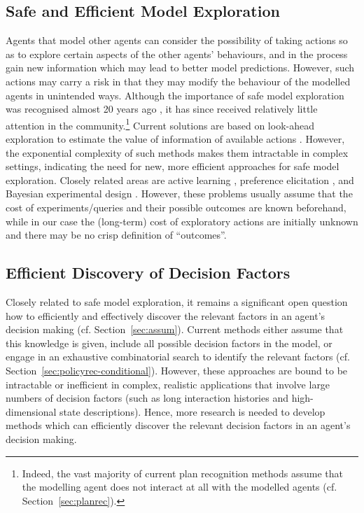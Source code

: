 \documentclass[final,1p,times,authoryear]{elsarticle}
\begin{document}
		\subsection{Safe and Efficient Model Exploration}

Agents that model other agents can consider the possibility of taking actions so as to explore certain aspects of the other agents' behaviours, and in the process gain new information which may lead to better model predictions. However, such actions may carry a risk in that they may modify the behaviour of the modelled agents in unintended ways. Although the importance of safe model exploration was recognised almost 20 years ago \citep{cm1998}, it has since received relatively little attention in the community.\footnote{Indeed, the vast majority of current plan recognition methods assume that the modelling agent does not interact at all with the modelled agents (cf. Section~\ref{sec:planrec}).} Current solutions are based on look-ahead exploration to estimate the value of information of available actions \citep{acr2016aij,cb2003,cm1999}. However, the exponential complexity of such methods makes them intractable in complex settings, indicating the need for new, more efficient approaches for safe model exploration. Closely related areas are active learning \citep{b2012}, preference elicitation \citep{b2002,ckp2000}, and Bayesian experimental design \citep{cv1995}. However, these problems usually assume that the cost of experiments/queries and their possible outcomes are known beforehand, while in our case the (long-term) cost of exploratory actions are initially unknown and there may be no crisp definition of ``outcomes''.


		\subsection{Efficient Discovery of Decision Factors}

Closely related to safe model exploration, it remains a significant open question how to efficiently and effectively discover the relevant factors in an agent's decision making (cf. Section~\ref{sec:assum}). Current methods either assume that this knowledge is given, include all possible decision factors in the model, or engage in an exhaustive combinatorial search to identify the relevant factors (cf. Section~\ref{sec:policyrec-conditional}). However, these approaches are bound to be intractable or inefficient in complex, realistic applications that involve large numbers of decision factors (such as long interaction histories and high-dimensional state descriptions). Hence, more research is needed to develop methods which can efficiently discover the relevant decision factors in an agent's decision making.
\end{document}
